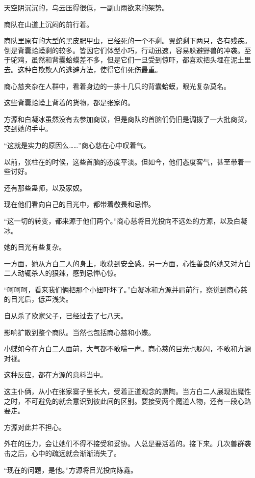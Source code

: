
\begin{this_body}

天空阴沉沉的，乌云压得很低，一副山雨欲来的架势。

商队在山道上沉闷的前行着。

商队里原有的大型的黑皮肥甲虫，已经死的一个不剩。翼蛇剩下两只，各有残疾。倒是背囊蛤蟆剩的较多。皆因它们体型小巧，行动迅速，容易躲避野兽的冲袭。至于驼鸡，虽然和背囊蛤蟆差不多，但是它们一旦受到惊吓，都喜欢把头埋在泥土里去。这种自欺欺人的逃避方法，使得它们死伤最重。

商心慈夹杂在人群中，看着身边的一排十几只的背囊蛤蟆，眼光复杂莫名。

这些背囊蛤蟆上背着的货物，都是张家的。

方源和白凝冰虽然没有去参加商议，但是商队的首脑们仍旧是调拨了一大批商货，交到她的手中。

“这就是实力的原因么……”商心慈在心中叹着气。

以前，张柱在的时候，这些首脑的态度平淡。但如今，他们态度客气，甚至带着一些讨好。

还有那些蛊师，以及家奴。

现在他们看向自己的目光中，都带着敬畏和忌惮。

“这一切的转变，都来源于他们两个。”商心慈将目光投向不远处的方源，以及白凝冰。

她的目光有些复杂。

一方面，她从方白二人的身上，收获到安全感。另一方面，心性善良的她又对方白二人动辄杀人的狠辣，感到忌惮心惊。

“呵呵呵，看来我们俩把那个小妞吓坏了。”白凝冰和方源并肩前行，察觉到商心慈的目光后，低声浅笑。

自从杀了欧家父子，已经过去了七八天。

影响扩散到整个商队。当然也包括商心慈和小蝶。

小蝶如今在方白二人面前，大气都不敢喘一声。商心慈的目光也躲闪，不敢和方源对视。

这种反应，都在方源的意料当中。

这主仆俩，从小在张家寨子里长大，受着正道观念的熏陶。当方白二人展现出魔性之时，不可避免的就会意识到彼此间的区别。要接受两个魔道人物，还有一段心路要走。

方源对此并不担心。

外在的压力，会让她们不得不接受和妥协。人总是要活着的。接下来。几次兽群袭击之后，心中的疏远就会渐渐消失了。

“现在的问题，是他。”方源将目光投向陈鑫。


\end{this_body}
